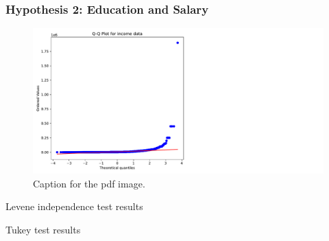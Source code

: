 \subsubsection{Hypothesis 2: Education and Salary}

\begin{figure}[H]
    \centering
    \includegraphics[width=\columnwidth]{images/hyp_2_norm_dist_income data.pdf} %
    \caption{Caption for the pdf image.}
    \label{fig:Independence test for anova test}
\end{figure}

\begin{table}[H]
    \centering
    \caption{Levene independence test results}
    \label{tab:Levene test results}
    \begin{minipage}{\columnwidth}
        
    \end{minipage}
\end{table}

\begin{table}[H]
    \centering
    \scriptsize
    \caption{Tukey test results}
    \label{tab:tukey test results}
    \begin{minipage}{\columnwidth}
        \centering
        
    \end{minipage}
\end{table}
